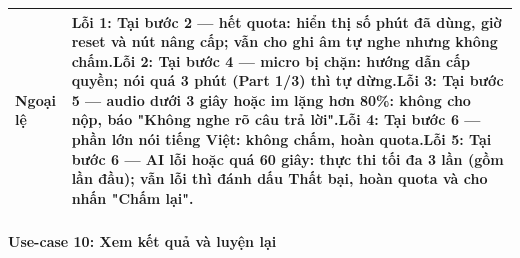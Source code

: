 \begin{longtable}{|p{3.2cm}|p{\dimexpr\linewidth-3.2cm-4\tabcolsep-3\arrayrulewidth\relax}|}
\textbf{Ngoại lệ} & \textbf{Lỗi 1:} Tại bước 2 --- hết quota: hiển thị số phút đã dùng, giờ reset và nút nâng cấp; vẫn cho ghi âm tự nghe nhưng không chấm.\newline \textbf{Lỗi 2:} Tại bước 4 --- micro bị chặn: hướng dẫn cấp quyền; nói quá 3 phút (Part 1/3) thì tự dừng.\newline \textbf{Lỗi 3:} Tại bước 5 --- audio dưới 3 giây hoặc im lặng hơn 80\%: không cho nộp, báo "Không nghe rõ câu trả lời".\newline \textbf{Lỗi 4:} Tại bước 6 --- phần lớn nói tiếng Việt: không chấm, hoàn quota.\newline \textbf{Lỗi 5:} Tại bước 6 --- AI lỗi hoặc quá 60 giây: thực thi tối đa 3 lần (gồm lần đầu); vẫn lỗi thì đánh dấu Thất bại, hoàn quota và cho nhấn "Chấm lại". \\ \hline
\end{longtable}
\endgroup


\paragraph{Use-case 10: Xem kết quả và luyện lại}


